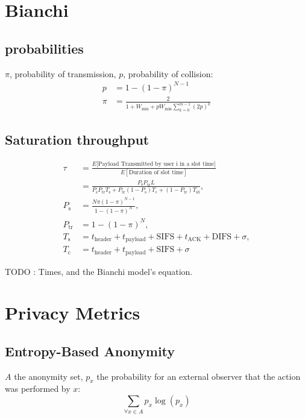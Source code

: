 \documentclass[11pt, a4paper,twocolumn]{scrartcl}
\begin{document}
\section{Bianchi}

\subsection{probabilities}
$\pi$, probability of transmission, $p$, probability of collision:
\begin{align*}
p &= 1-(1-\pi)^{N-1} \\
\pi &= \frac{2}{ 1 + W_\textrm{min} + pW_\textrm{min}\sum^{m-1}_{k=0}(2p)^k}
\end{align*}

\subsection{Saturation throughput}

\begin{align*}
 \tau &= \frac{E\lbrack\textrm{Payload Transmitted by user i in a slot time}\rbrack}{E[\textrm{Duration of slot time}]} \\ 
 &= \frac{P_\textrm{s}P_{\textrm{tr}}L}{P_\textrm{s}P_{\textrm{tr}}T_{\textrm{s}} + P_\textrm{tr}(1-P_\textrm{s})T_\textrm{c} + (1-P_\textrm{tr})T_\textrm{id}}, \\
 P_\textrm{s} &= \frac{N\pi (1-\pi)^{N-1}}{1-(1-\pi)^N}, \\
 P_\textrm{tr} &= 1-(1-\pi)^N, \\
 T_\textrm{s} &= t_\textrm{header} + t_\textrm{payload} + \textrm{SIFS} + t_\textrm{ACK} + \textrm{DIFS} + \sigma,\\
 T_\textrm{c} &= t_\textrm{header} + t_\textrm{payload} + \textrm{SIFS} + \sigma
\end{align*}

TODO : Times, and the Bianchi model's equation.

\section{Privacy Metrics}

\subsection{Entropy-Based Anonymity}
$A$ the anonymity set, $p_x$ the probability for an external observer that the action was performed by $x$:
\begin{equation}
	\sum_{\forall x \in A} p_x \log(p_x)
\end{equation}
\end{document}
